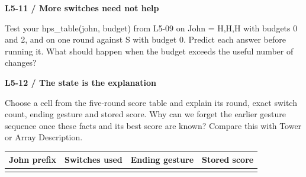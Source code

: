 \documentclass[11pt,a4paper]{article}
\begin{document}
\par\noindent\begin{minipage}{\linewidth}
\textbf{L5-11 / More switches need not help}\par\smallskip Test your hps\_table(john, budget) from L5-09 on John = H,H,H with budgets 0 and 2, and on one round against S with budget 0. Predict each answer before running it. What should happen when the budget exceeds the useful number of changes?\par
\end{minipage}\par\vspace{4mm}
\par\noindent\begin{minipage}{\linewidth}
\textbf{L5-12 / The state is the explanation}\par\smallskip Choose a cell from the five-round score table and explain its round, exact switch count, ending gesture and stored score. Why can we forget the earlier gesture sequence once these facts and its best score are known? Compare this with Tower or Array Description.\par
\par\medskip \begingroup\small\setlength{\tabcolsep}{4pt}\renewcommand{\arraystretch}{1.35}\begin{tabularx}{\linewidth}{>{\raggedright\arraybackslash}X>{\raggedright\arraybackslash}X>{\raggedright\arraybackslash}X>{\raggedright\arraybackslash}X}\toprule\textbf{John prefix} & \textbf{Switches used} & \textbf{Ending gesture} & \textbf{Stored score}\\\midrule
 &  &  & \\
\bottomrule\end{tabularx}\endgroup\par\medskip 
\end{minipage}\par\vspace{4mm}
\end{document}
